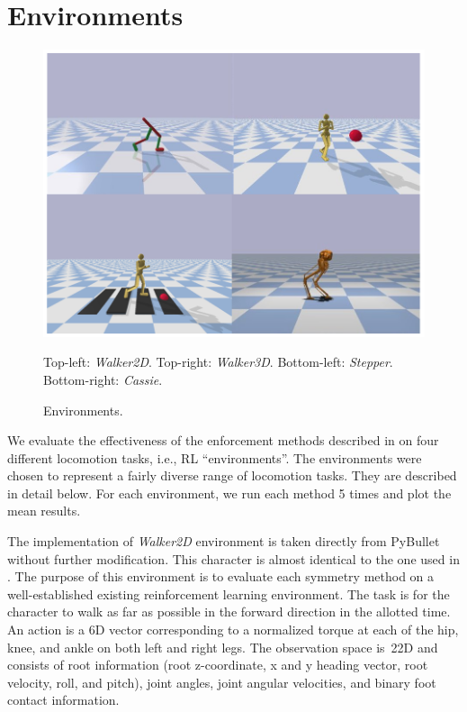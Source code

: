 \section{Environments}
\label{sec:environments}
\begin{figure}%
  \centering
  \includegraphics[width=0.9\columnwidth]{symmetry_figures/task_overview_2.png}
  \caption{Environments.}{Top-left: {\it Walker2D}. Top-right: {\it Walker3D}. Bottom-left: {\it Stepper}. Bottom-right: {\it Cassie}.}
  \label{fig:task-overview}
\end{figure}

We evaluate the effectiveness of the enforcement methods described in  
on four different locomotion tasks, i.e., RL ``environments''.  
The environments were chosen to represent a fairly diverse range of locomotion tasks.  
They are described in detail below.  
For each environment, we run each method 5 times and plot the mean results.

 The implementation of {\it Walker2D} environment is taken directly from PyBullet \citep{ref:Pybullet} 
without further modification. This character is almost identical to the one used in . The purpose of this environment is to evaluate each symmetry method on 
a well-established existing reinforcement learning environment.  
The task is for the character to walk as far as possible in the forward direction in the allotted time.  
An action is a 6D vector corresponding to a normalized torque at each of the hip, knee, and ankle on both left and right legs.  
The observation space is~22D and consists of root information (root z-coordinate, x and y heading vector, root velocity, 
roll, and pitch), joint angles, joint angular velocities, and binary foot contact information.

